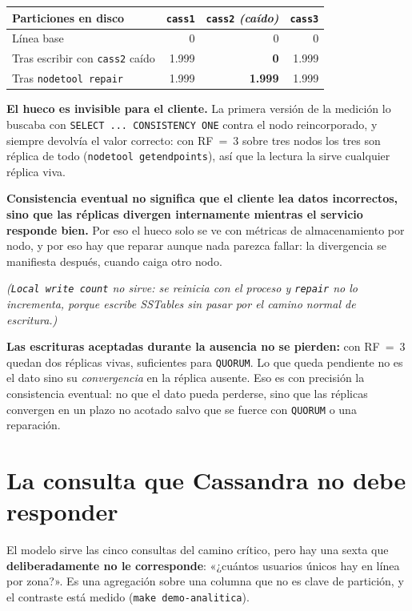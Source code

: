 \documentclass[11pt,a4paper]{article}
\begin{document}
\begin{center}\small
\begin{tabular}{@{}lrrr@{}}
\toprule
\textbf{Particiones en disco} & \texttt{cass1} & \texttt{cass2} \emph{(caído)} & \texttt{cass3} \\
\midrule
Línea base & 0 & 0 & 0 \\
Tras escribir con \texttt{cass2} caído & 1.999 & \textcolor{rojo}{\textbf{0}} & 1.999 \\
Tras \texttt{nodetool repair} & 1.999 & \textcolor{verde}{\textbf{1.999}} & 1.999 \\
\bottomrule
\end{tabular}
\end{center}

\begin{hallazgo}
\textbf{El hueco es invisible para el cliente.} La primera versión de la medición lo
buscaba con \texttt{SELECT ... CONSISTENCY ONE} contra el nodo reincorporado, y siempre
devolvía el valor correcto: con RF~=~3 sobre tres nodos los tres son réplica de todo
(\texttt{nodetool getendpoints}), así que la lectura la sirve cualquier réplica viva.

\smallskip
\textbf{Consistencia eventual no significa que el cliente lea datos incorrectos, sino que
las réplicas divergen internamente mientras el servicio responde bien.} Por eso el hueco
solo se ve con métricas de almacenamiento por nodo, y por eso hay que reparar aunque nada
parezca fallar: la divergencia se manifiesta después, cuando caiga otro nodo.
\end{hallazgo} \emph{(\texttt{Local write count} no sirve: se reinicia con
el proceso y \texttt{repair} no lo incrementa, porque escribe SSTables sin pasar por
el camino normal de escritura.)}

\smallskip
\noindent\textbf{Las escrituras aceptadas durante la ausencia no se pierden:} con
RF~=~3 quedan dos réplicas vivas, suficientes para \texttt{QUORUM}. Lo que queda
pendiente no es el dato sino su \emph{convergencia} en la réplica ausente. Eso es
con precisión la consistencia eventual: no que el dato pueda perderse, sino que las
réplicas convergen en un plazo no acotado salvo que se fuerce con \texttt{QUORUM} o
una reparación.

\section{La consulta que Cassandra no debe responder}
El modelo sirve las cinco consultas del camino crítico, pero hay una sexta que
\textbf{deliberadamente no le corresponde}: «¿cuántos usuarios únicos hay en línea
por zona?». Es una agregación sobre una columna que no es clave de partición, y el
contraste está medido (\texttt{make demo-analitica}).
\end{document}
